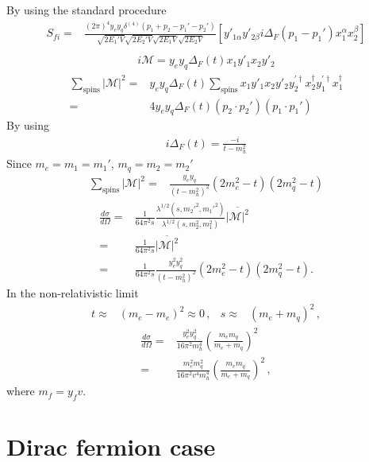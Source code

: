 By using the standard procedure
\begin{align}
      S_{fi}
    =&\frac{(2\pi)^4y_e y_q \delta^{(4)}\left(p_1+p_2-p_1'-p_2'\right) }{\sqrt{2 E_1'V}\sqrt{2 E_2'V}\sqrt{2 E_1V}\sqrt{2 E_2V}}
 \left[y'_{1\alpha}y'_{2\beta}i\Delta_F(p_1-p_1')x_1^{\alpha}x_2^{\beta}\right] \nonumber\\
\end{align}
\begin{align}
 i\mathcal{M}=y_e y_q\Delta_F(t) x_1y'_1x_2y'_2 
\end{align}
\begin{align}
\sum_{\text{spins}} |\mathcal{M}|^2=&y_e y_q\Delta_F(t) \sum_{\text{spins}}  x_1y'_1x_2y'_2  y^{\prime\dagger}_2x_2^{\dagger} y^{\prime\dagger}_1x^{\dagger}_1 \nonumber\\
=& 4 y_e y_q\Delta_F(t) \left( p_2\cdot p_2' \right) \left(p_1\cdot p_1'  \right)
\end{align}
By using
\begin{align}
  i\Delta_F(t)=\frac{-i}{t-m_h^2}
\end{align}
Since $m_e=m_1=m_1'$, $m_q=m_2=m_2'$
\begin{align}
   \sum_{\text{spins}} |\mathcal{M}|^2=&\frac{y_ey_q}{\left( t-m_h^2 \right)^2} \left(2m_e^2-t\right)\left(2m_q^2-t\right)
\end{align}
\begin{align}
     \frac{d\sigma}{d\Omega}=&\frac{1}{64\pi^2s}
\frac{\lambda^{1/2}(s,{m_2'}^2,{m_1'}^2)}{\lambda^{1/2}(s,m_2^2,m_1^2)}
\overline{|\mathcal{M}|^2} \nonumber\\
=&\frac{1}{64\pi^2s}\overline{|\mathcal{M}|^2} \nonumber\\
=&\frac{1}{64\pi^2s}\frac{y_e^2y_q^2}{\left( t-m_h^2 \right)^2}\left(2m_e^2-t\right)\left(2m_q^2-t\right) .
\end{align}
In the non-relativistic limit
\begin{align}
  t\approx& (m_e-m_e)^2\approx 0\,,& 
  s\approx& (m_e+m_q)^2\,,
\end{align}
\begin{align}
       \frac{d\sigma}{d\Omega}
                    =&\frac{y_e^2y_q^2}{16\pi^2m_h^4}\left( \frac{m_em_q}{m_e+m_q} \right)^2 \nonumber\\
=&\frac{m_e^2m_q^2}{16\pi^2v^4 m_h^4}\left( \frac{m_em_q}{m_e+m_q} \right)^2\,,
\end{align}
where $m_f=y_f v$.


\section{Dirac fermion case}



